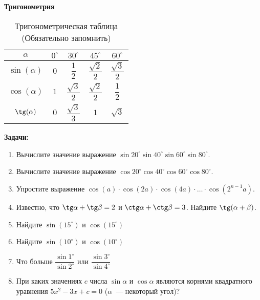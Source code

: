 \documentclass{article}
\begin{document}
\large
	
	
	\begin{center}
		\textbf{Тригонометрия}
	\end{center}


\begin{table}[h]\label{table-2} 
	\centering
	\begin{tabular}{|c|c|c|c|c|}
		\hline
		\textbf{$\alpha$} & \textbf{$0^\circ$} & \textbf{$30^\circ$} & \textbf{$45^\circ$} & \textbf{$60^\circ$} \\\hline
		$\sin(\alpha)$ & $0$ & $\dfrac{1}{2}$ & $\dfrac{\sqrt{2}}{2}$ & $\dfrac{\sqrt{3}}{2}$ \\[3mm]\hline
		$\cos(\alpha)$ & $1$ & $\dfrac{\sqrt{3}}{2}$  & $\dfrac{\sqrt{2}}{2}$ & $\dfrac{1}{2}$ \\[3mm]\hline
		$\tg(\alpha)$ & $0$ & $\dfrac{\sqrt{3}}{3}$ & $1$ & $\sqrt{3}$ \\[3mm]\hline
	\end{tabular}
	\caption{Тригонометрическая таблица (Обязательно запомнить)}
\end{table}


\textbf{Задачи:}

\begin{enumerate}[label*=\protect\fbox{\arabic{enumi}}]
	
	\setcounter{enumi}{0}
	
	\item Вычислите значение выражение $\sin 20^\circ \sin 40^\circ \sin 60^\circ \sin 80^\circ$.

	\item Вычислите значение выражение $\cos 20^\circ \cos 40^\circ \cos 60^\circ \cos 80^\circ$.
	
	\item Упростите выражение $\cos (a) \cdot \cos (2a) \cdot \cos (4a) \cdot \dotsc \cdot \cos (2^{n-1}a)$.
	
	\item Известно, что  $\tg \alpha + \tg \beta = 2$ и $\ctg \alpha + \ctg \beta = 3$.  Найдите $ \tg (\alpha + \beta) $.
	
	\item Найдите $ \sin(15^\circ) $ и  $ \cos(15^\circ) $ 
	
	\item Найдите $ \sin(10^\circ) $ и $ \cos(10^\circ) $ 
	
	\item Что больше $\dfrac{\sin1^\circ}{\sin2^\circ}$ или $\dfrac{\sin3^\circ}{\sin4^\circ}$

	\item При каких значениях $c$ числа $ \sin \alpha $  и $ \cos \alpha $ являются корнями квадратного уравнения  $5x^2 - 3x + c = 0$  ($ \alpha $~--- некоторый угол)?
\end{enumerate}
\end{document}
